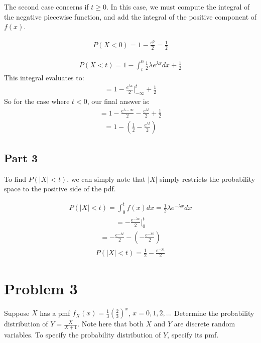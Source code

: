 \documentclass{article}
\begin{document}
The second case concerns if $t\geq 0$. In this case, we must compute the integral of the negative piecewise function, and add the integral of the positive component of $f(x)$.

\begin{align*}
P(X<0) = 1-\frac{e^{0}}{2} = \frac{1}{2}
\end{align*}

\begin{align*}
P(X<t) = 1- \int_{t}^{0} \tfrac{1}{2} \lambda e^{\lambda x}dx + \frac{1}{2}
\end{align*}
This integral evaluates to:
\begin{align*}
 = 1- \frac{e^{\lambda x}}{2} |_{-\infty}^{t} + \frac{1}{2}
\end{align*}
So for the case where $t<0$, our final answer is:
\begin{align*}
 = 1- \frac{e^{\lambda -\infty}}{2} - \frac{e^{\lambda t}}{2} + \frac{1}{2}
\end{align*}
\begin{align*}
 = \boxed{1 - (\frac{1}{2} - \frac{e^{\lambda t}}{2})}
\end{align*}
\subsection*{Part 3}
To find $P(|X|<t)$, we can simply note that $|X|$ simply restricts the probability space to the positive side of the pdf.

\begin{align*}
P(|X|<t) = \int_{0}^{t} f(x) dx = \frac{1}{2} \lambda e^{-\lambda x} dx
\end{align*}
\begin{align*}
 = - \frac{e^{-\lambda x}}{2} |_{0}^{t}
\end{align*}
\begin{align*}
 = - \frac{e^{-\lambda t}}{2} - (- \frac{e^{-\lambda 0}}{2})
\end{align*}
\begin{align*}
\boxed{P(|X|<t) = \frac{1}{2} - \frac{e^{-\lambda t}}{2} }
\end{align*}


\clearpage

\section*{Problem 3}
Suppose $X$ has a pmf $f_X(x)=\frac{1}{3}(\frac{2}{3})^x$, $x=0,1,2,...$ Determine the probability distribution of $Y=\frac{X}{X+1}$. Note here that both $X$ and $Y$ are discrete random variables. To specify the probability distribution of $Y$, specify its pmf.
\end{document}
